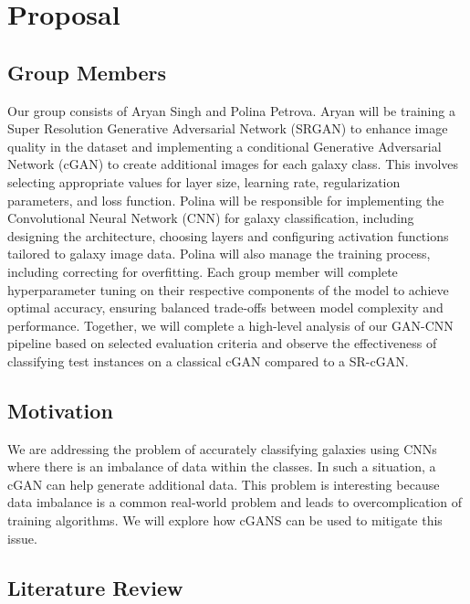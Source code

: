\section{Proposal}
\label{sec:intro}


\subsection{Group Members}

Our group consists of Aryan Singh and Polina Petrova. 
Aryan will be training a Super Resolution Generative Adversarial Network (SRGAN) to enhance image quality in the dataset 
and implementing a conditional Generative Adversarial Network (cGAN) to create additional images for each galaxy class. 
This involves selecting appropriate values for layer size, learning rate, regularization parameters, and loss function.
Polina will be responsible for implementing the Convolutional Neural Network (CNN) for galaxy classification, 
including designing the architecture, choosing layers and configuring activation functions tailored to galaxy image data. 
Polina will also manage the training process, including correcting for overfitting. 
Each group member will complete hyperparameter tuning on their respective components of the model to achieve optimal accuracy, 
ensuring balanced trade-offs between model complexity and performance. 
Together, we will complete a high-level analysis of our GAN-CNN pipeline based on selected evaluation criteria and observe the effectiveness of classifying test instances on a classical cGAN compared to a SR-cGAN. 


\subsection{Motivation}

We are addressing the problem of accurately classifying galaxies using CNNs where there is an imbalance of data within the classes. 
In such a situation, a cGAN can help generate additional data. 
This problem is interesting because data imbalance is a common real-world problem and leads to overcomplication of training algorithms.
We will explore how cGANS can be used to mitigate this issue.

\subsection{Literature Review}

